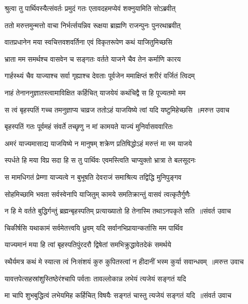 \twolineshloka
{श्रुत्वा तु पार्थिवस्यैत्संवर्तः प्रमुदं गतः}
{एतावदहमप्येवं शक्नुयामिति सोऽब्रवीत्}


\twolineshloka
{ततो मरुत्तमुन्मत्तो वाचा निर्भर्त्सयन्निव}
{रूक्षया ब्राह्मणि राजन्पुनः पुनरथाब्रवीत्}


\twolineshloka
{वातप्रधानेन मया स्वचित्तवशवर्तिना}
{एवं विकृतरूपेण कथं याजितुमिच्छसि}


\twolineshloka
{भ्राता मम समर्थश्च वासवेन च सङ्गतः}
{वर्तते याजने चैव तेन कर्माणि कारय}


\twolineshloka
{गार्हस्थ्यं चैव याज्याश्च सर्वा गृह्याश्च देवताः}
{पूर्वजेन ममाक्षिप्तं शरीरं वर्जितं त्विदम्}


\twolineshloka
{नाहं तेनाननुज्ञातस्त्वामाविक्षित कर्हिचित्}
{याजयेयं कथंचिद्वै स हि पूज्यतमो मम}


\threelineshloka
{स त्वं बृहस्पतिं गच्च तमनुज्ञाप्य चाव्रज}
{ततोऽहं याजयिष्ये त्वां यदि यष्टुमिहेच्छसि ॥मरुत्त उवाच}
{}


\twolineshloka
{बृहस्पतिं गतः पूर्वमहं संवर्ते तच्छृणु}
{न मां कामयते याज्यं मुनिर्वासववारितः}


\twolineshloka
{अमरं याज्यमासाद्य याजयिष्ये न मानुषम्}
{शक्रेण प्रतिषिद्धोऽहं मरुत्तं मा स्म याजये}


\twolineshloka
{स्पर्धते हि मया विप्र सदा हि स तु पार्थिवः}
{एवमस्त्विति चाप्युक्तो भ्रात्रा ते बलसूदनः}


\twolineshloka
{स मामधिगतं प्रेम्णा याज्यत्वे न बुभूषति}
{देवराजं समाश्रित्य तद्विद्धि मुनिपुङ्गव}


\twolineshloka
{सोहमिच्छामि भवता सर्वस्वेनापि याजितुम्}
{कामये समतिक्रान्तुं वासवं त्वत्कृतैर्गुणैः}


\threelineshloka
{न हि मे वर्तते बुद्धिर्गन्तुं ब्रह्मन्बृहस्पतिम्}
{प्रत्याख्यातो हि तेनास्मि तथाऽनपकृते सति ॥संवर्त उवाच}
{}


\twolineshloka
{चिकीर्षसि यथाकामं सर्वमेतत्त्वयि ध्रुवम्}
{यदि सर्वानभिप्रायान्कर्तासि मम पार्थिव}


\twolineshloka
{याज्यमानं मया हि त्वां बृहस्पतिपुंरदरौ}
{द्विषेतां समभिक्रुद्धावेतदेकं समर्थये}


\threelineshloka
{स्थैर्यमत्र कथं मे स्यात्स त्वं निःसंशयं कुरु}
{कुपितस्त्वां न हीदानीं भस्म कुर्या सवान्धवम् ॥मरुत्त उवाच}
{}


\twolineshloka
{यावत्तपेत्सहस्रांशुस्तिष्ठेरंश्चापि पर्वताः}
{तावल्लोकान्न लभेयं त्यजेयं सङ्गतं यदि}


\threelineshloka
{मा चापि शुभबुद्धित्वं लभेयमिह कर्हिचित्}
{विषयैः सङ्गतं चास्तु त्यजेयं सङ्गतं यदि ॥संवर्त उवाच}
{}


